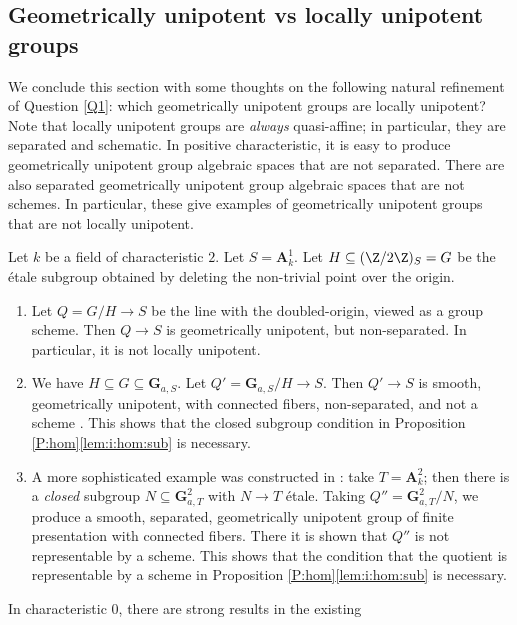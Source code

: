 \documentclass[reqno,a4paper]{amsart}
\numberwithin{Theorem}{section}
\theoremstyle{plain}
\theoremstyle{remark}
\begin{document}
\subsection{Geometrically unipotent vs locally unipotent groups} \label{ss:geounivslocal} We conclude this section with some thoughts on the following natural
refinement of Question \ref{Q1}: which geometrically unipotent groups are locally unipotent?
Note that locally unipotent groups are \emph{always} quasi-affine; in
particular, they are separated and schematic. In positive characteristic, it is easy
to produce geometrically unipotent group algebraic spaces that are not
separated. There are also separated geometrically unipotent group algebraic spaces that are not schemes. In particular, these give examples of geometrically unipotent groups that are not locally unipotent.
\begin{Example}\label{E:non-separated-unipotent}   Let $k$ be a field of characteristic $2$. Let
  $S = \mathbf{A}^1_{k}$. Let $H \subseteq (\Z/2\Z)_S=G$ be the
  \'etale subgroup obtained by deleting the non-trivial point over the
  origin.
  \begin{enumerate}
  \item Let $Q=G/H \to S$ be the
    line with the doubled-origin, viewed as a group scheme. Then
    $Q \to S$ is geometrically unipotent, but non-separated. In particular, it is
    not locally unipotent.
  \item We have $H \subseteq G \subseteq \mathbf{G}_{a,S}$. Let
    $Q' = \mathbf{G}_{a,S}/H \to S$. Then $Q' \to S$ is smooth,
    geometrically unipotent, with connected fibers, non-separated, and not a scheme 
    \cite[VI$_{\mathrm{B}}$.5.5]{SGA3-I-NEW}. This shows that the closed subgroup condition in
    Proposition \ref{P:hom}\eqref{lem:i:hom:sub} is necessary.
  \item A more sophisticated example was constructed in
    \cite[X.14]{Raynaud}: take $T=\mathbf{A}^2_{k}$; then there is a
    \emph{closed} subgroup $N \subseteq \mathbf{G}_{a,T}^2$ with
    $N \to T$ \'etale. Taking $Q'' = \mathbf{G}_{a,T}^2/N$, we produce
    a smooth, separated, geometrically unipotent group of finite
    presentation with connected fibers. There it is shown that $Q''$
    is not representable by a scheme. This shows that the condition
    that the quotient is representable by a scheme in Proposition
    \ref{P:hom}\eqref{lem:i:hom:sub} is necessary.
\end{enumerate}
\end{Example}
In characteristic $0$, there are strong results in the existing
\end{document}
